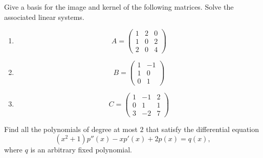 \begin{Pb}
Give a basis for the image and kernel of the following matrices. Solve the associated linear systems.
\begin{enumerate}
\item \[A= \begin{pmatrix} 1 & 2 & 0 \\ 1 & 0 & 2 \\ 2 & 0 & 4 \end{pmatrix} \]
\item \[B= \begin{pmatrix} 1 & -1 \\ 1 & 0 \\  0 & 1 \end{pmatrix} \]
\item \[C= \begin{pmatrix} 1 & -1 & 2 \\ 0 & 1 & 1 \\ 3 & -2 & 7 \end{pmatrix} \]
\end{enumerate}
\end{Pb}

\begin{Pb}
Find all the polynomials of degree at most $2$ that satisfy the differential equation
\[(x^2+1)p''(x) -xp'(x) +2p(x) = q(x),\]
where $q$ is an arbitrary fixed polynomial.
\end{Pb}
